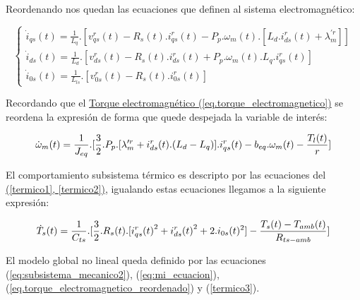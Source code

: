 \documentclass{article}
\begin{document}
Reordenando nos quedan las ecuaciones que definen al sistema electromagnético:

\begin{equation}\label{eq:mi_ecuacion}
    \begin{cases}
        \dot{i}_{qs}(t) = \frac{1}{L_{q}}.[v_{qs}^r(t) - R_{s}(t).i_{qs}^r(t) - P_{p}.\omega_{m}(t).[L_{d}.i_{ds}^r(t) + \lambda_{m}^{\prime r}]]  \\
        \dot{i}_{ds}(t) = \frac{1}{L_{d}}.[v_{ds}^r(t) - R_{s}(t).i_{ds}^r(t) + P_{p}.\omega_{m}(t).L_{q}.i_{qs}^r(t)]  \\
        \dot{i}_{0s}(t) = \frac{1}{L_{ls}}.[v_{0s}^r(t) - R_{s}(t).i_{0s}^r(t)]
    \end{cases}
\end{equation}

Recordando que el
\hyperref[eq.torque_electromagnetico]{Torque electromagnético (\ref*{eq.torque_electromagnetico})} 
se reordena la expresión de forma que quede despejada la variable de interés:

\begin{equation}\label{eq.torque_electromagnetico_reordenado}
    \dot{\omega}_{m}(t) = \frac{1}{J_{eq}}.[\frac{3}{2}.P_{p}.[\lambda_{m}^{\prime r}+i_{ds}^r(t).(L_{d}-L_{q})].i_{qs}^r(t) - b_{eq}.\omega_{m}(t) - \frac{T_{l}(t)}{r}]\\
\end{equation}

El comportamiento subsistema térmico es descripto por las ecuaciones del
\hyperref[termico1, termico2]{(\ref*{termico1}, \ref*{termico2})}, igualando estas ecuaciones 
llegamos a la siguiente expresión:

\begin{equation}\label{termico3}
    \dot{T}_{s}(t) = \frac{1}{C_{ts}}.[\frac{3}{2}.R_{s}(t).[{i_{qs}^r(t)}^2+{i_{ds}^r(t)}^2 + 2.i_{0s}(t)^2] - \frac{T_{s}(t)-T_{amb}(t)}{R_{ts-amb}}]\\
\end{equation}

El modelo global no lineal queda definido por las ecuaciones (\ref{eq:subsistema_mecanico2}),
(\ref{eq:mi_ecuacion}), (\ref{eq.torque_electromagnetico_reordenado}) y (\ref{termico3}).
\end{document}

